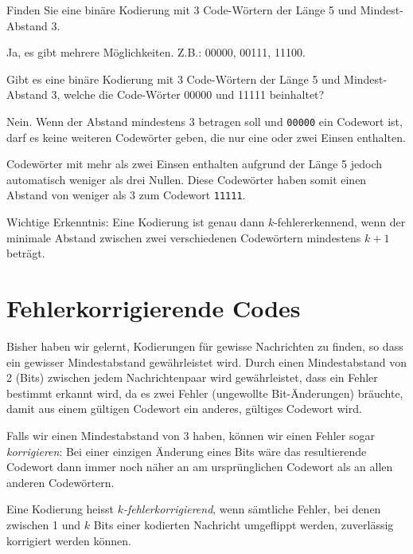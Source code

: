 \begin{mychallenge}\label{challenge:3code}
	Finden Sie eine binäre Kodierung mit 3 Code-Wörtern der Länge 5 und Mindest-Abstand 3.
	\begin{myanswer}
		Ja, es gibt mehrere Möglichkeiten. Z.B.: 00000, 00111, 11100.
	\end{myanswer}
\end{mychallenge}

\begin{mychallenge}
	Gibt es eine binäre Kodierung mit 3 Code-Wörtern der Länge 5 und Mindest-Abstand 3, welche die Code-Wörter 00000 und 11111 beinhaltet?
	\begin{myanswer}
		Nein. Wenn der Abstand mindestens 3 betragen soll und
		\texttt{00000} ein Codewort ist, darf es keine weiteren
		Codewörter geben, die nur eine oder zwei Einsen enthalten.

		Codewörter mit mehr als zwei Einsen enthalten aufgrund
		der Länge 5 jedoch automatisch weniger als drei Nullen.
		Diese Codewörter haben somit einen Abstand von weniger
		als 3 zum Codewort \texttt{11111}.
	\end{myanswer}
\end{mychallenge}

\begin{myremark}
	Wichtige Erkenntnis: Eine Kodierung ist genau dann \(k\)-fehlererkennend, wenn
	der minimale Abstand zwischen zwei verschiedenen Codewörtern
	mindestens \(k+1\) beträgt.
\end{myremark}

\clearpage
\section{Fehlerkorrigierende Codes}

Bisher haben wir gelernt, Kodierungen für gewisse Nachrichten zu finden, so dass ein gewisser Mindestabstand gewährleistet wird. Durch einen Mindestabstand von 2 (Bits) zwischen jedem Nachrichtenpaar wird gewährleistet, dass ein Fehler bestimmt erkannt wird, da es zwei Fehler (ungewollte Bit-Änderungen) bräuchte, damit aus einem gültigen Codewort ein anderes, gültiges Codewort wird.

Falls wir einen Mindestabstand von 3 haben, können wir einen Fehler sogar \textit{korrigieren}: Bei einer einzigen Änderung eines Bits wäre das resultierende Codewort dann immer noch näher an am ursprünglichen Codewort als an allen anderen Codewörtern.
\begin{mydefinition}
	Eine Kodierung heisst \emph{\(k\)-fehlerkorrigierend}, wenn sämtliche
	Fehler, bei denen zwischen 1 und \(k\) Bits einer kodierten
	Nachricht umgeflippt werden, zuverlässig korrigiert werden können.
\end{mydefinition}

